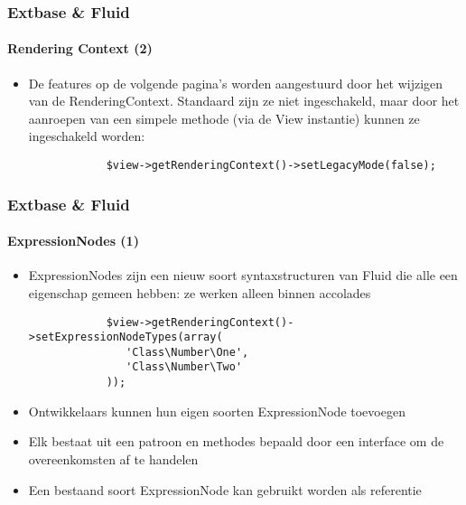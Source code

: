 \begin{frame}[fragile]
	\frametitle{Extbase \& Fluid}
	\framesubtitle{Rendering Context (2)}

	\lstset{basicstyle=\smaller\ttfamily}

	\begin{itemize}

		\item De features op de volgende pagina's worden aangestuurd door het wijzigen van de
			RenderingContext. Standaard zijn ze niet ingeschakeld, maar door het aanroepen van
			een simpele methode (via de View instantie) kunnen ze ingeschakeld worden:

		\begin{lstlisting}
			$view->getRenderingContext()->setLegacyMode(false);
		\end{lstlisting}

	\end{itemize}

\end{frame}


\begin{frame}[fragile]
	\frametitle{Extbase \& Fluid}
	\framesubtitle{ExpressionNodes (1)}

	\lstset{basicstyle=\smaller\ttfamily}

	\begin{itemize}

		\item ExpressionNodes zijn een nieuw soort syntaxstructuren van Fluid die alle
			een eigenschap gemeen hebben: ze werken alleen binnen accolades

		\begin{lstlisting}
			$view->getRenderingContext()->setExpressionNodeTypes(array(
			   'Class\Number\One',
			   'Class\Number\Two'
			));
		\end{lstlisting}

		\item Ontwikkelaars kunnen hun eigen soorten ExpressionNode toevoegen

		\item Elk bestaat uit een patroon en methodes bepaald door een interface om de overeenkomsten
			af te handelen

		\item Een bestaand soort ExpressionNode kan gebruikt worden als referentie

	\end{itemize}

\end{frame}


